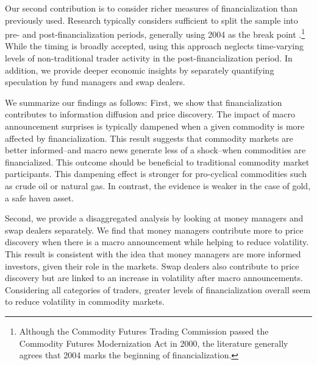 \documentclass[12pt]{article}
\begin{document}
Our second contribution is to consider richer measures of financialization than previously used. Research typically considers sufficient to split the sample into pre- and post-financialization periods, generally using 2004 as the break point \citep{buyukcsahin2010matters, kilian2014role,brunetti2016speculators,irwin2012financialization,stoll2010commodity,alquist2013role}.\footnote{Although the Commodity Futures Trading Commission passed the Commodity Futures Modernization Act in 2000, the literature generally agrees that 2004 marks the beginning of financialization.} While the timing is broadly accepted, using this approach neglects time-varying levels of non-traditional trader activity in the post-financialization period. In addition, we provide deeper economic insights by separately quantifying speculation by fund managers and swap dealers.


 We summarize our findings as follows: First, we show that financialization contributes to information diffusion and price discovery. The impact of macro announcement surprises is typically dampened when  a given commodity is more affected by financialization. This result suggests that commodity markets are better informed--and macro news generate less of a shock--when commodities are financialized. This outcome should be beneficial to traditional commodity market participants.  This dampening effect  is stronger for pro-cyclical commodities such as crude oil or natural gas. In contrast, the evidence is weaker in the case of gold, a safe haven asset. %

Second, we provide a disaggregated analysis by looking at money managers and swap dealers separately. We find that money managers contribute more to price discovery when there is a macro announcement while helping to reduce volatility. This result is consistent with the idea that money managers are more informed investors, given their role in the markets. Swap dealers also contribute to price discovery but are linked to an increase in volatility after macro announcements. Considering all categories of traders, greater levels of financialization overall seem to reduce  volatility in commodity markets. 
\end{document}
